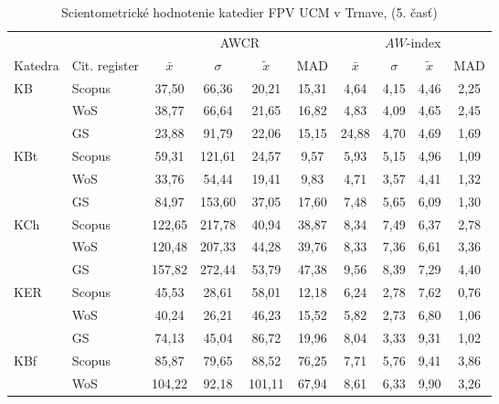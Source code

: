 \begin{table}
  \centering\small
  \caption[Hodnotenie FPV\,--\,AWCR a $AW$-index]{Scientometrické hodnotenie katedier FPV UCM v Trnave, (5. časť)}
\label{tab:5-staff.results}
\begin{tabularx}{\textwidth}{Xlcccc@{\hspace{3ex}}cccc}
  \toprule\noalign{\vspace{.3ex}}
          &       & \multicolumn{4}{c}{AWCR}         & \multicolumn{4}{c}{$AW$-index}  \\
  Katedra &  Cit. register& $\bar{x}$      & $\sigma$  & $\tilde{x}$ & MAD  & $\bar{x}$      & $\sigma$  & $\tilde{x}$  & MAD  \\[0.3ex]
  \midrule\noalign{\vspace{.5ex}}
 KB   & Scopus & 37,50  & 66,36  & 20,21  & 15,31  & 4,64     & 4,15 & 4,46  & 2,25 \\
      & WoS    & 38,77  & 66,64  & 21,65  & 16,82  & 4,83     & 4,09 & 4,65  & 2,45 \\
      & GS     & 23,88  & 91,79  & 22,06  & 15,15  & 24,88    & 4,70 & 4,69  & 1,69 \\[3ex]
 KBt  & Scopus & 59,31  & 121,61 & 24,57  & 9,57   & 5,93     & 5,15 & 4,96  & 1,09 \\
      & WoS    & 33,76  & 54,44  & 19,41  & 9,83   & 4,71     & 3,57 & 4,41  & 1,32 \\
      & GS     & 84,97  & 153,60 & 37,05  & 17,60  & 7,48     & 5,65 & 6,09  & 1,30 \\[3ex]
 KCh  & Scopus & 122,65 & 217,78 & 40,94  & 38,87  & 8,34     & 7,49 & 6,37  & 2,78 \\
      & WoS    & 120,48 & 207,33 & 44,28  & 39,76  & 8,33     & 7,36 & 6,61  & 3,36 \\
      & GS     & 157,82 & 272,44 & 53,79  & 47,38  & 9,56     & 8,39 & 7,29  & 4,40 \\[3ex]
 KER  & Scopus & 45,53  & 28,61  & 58,01  & 12,18  & 6,24     & 2,78 & 7,62  & 0,76 \\
      & WoS    & 40,24  & 26,21  & 46,23  & 15,52  & 5,82     & 2,73 & 6,80  & 1,06 \\
      & GS     & 74,13  & 45,04  & 86,72  & 19,96  & 8,04     & 3,33 & 9,31  & 1,02 \\[3ex]
 KBf  & Scopus & 85,87  & 79,65  & 88,52  & 76,25  & 7,71     & 5,76 & 9,41  & 3,86 \\
      & WoS    & 104,22 & 92,18  & 101,11 & 67,94  & 8,61     & 6,33 & 9,90  & 3,26 \\

\end{tabularx}
\end{table}
